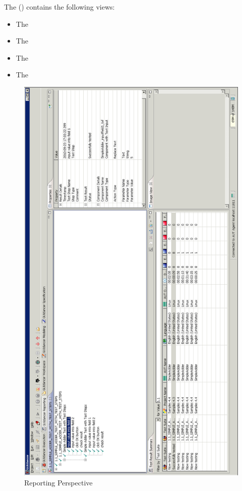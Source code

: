 The \reportpersp{} () contains the following views:

\begin{itemize}
\item The \gdtestresultview{}
\item The \gdpropview{} 
\item The \gdimgview{}
\item The \gdtestsummaryview{}
\end{itemize}


\begin{figure}
\includegraphics[width=12.5cm]{Userinterface/Editors/PS/reportingperspective}
\caption{Reporting Perspective}
\label{reportingperspective}
\end{figure}
\clearpage


